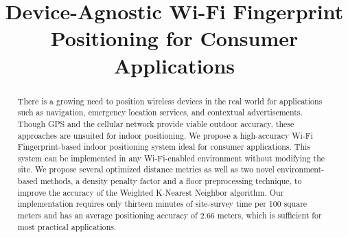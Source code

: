 \documentclass[conference]{IEEEtran}
\begin{document}
\title{Device-Agnostic Wi-Fi Fingerprint Positioning for Consumer Applications}

\author{
	
	
}

\maketitle

\begin{abstract}
There is a growing need to position wireless devices in the real world for applications such as navigation, emergency location services, and contextual advertisements. Though GPS and the cellular network provide viable outdoor accuracy, these approaches are unsuited for indoor positioning. We propose a high-accuracy Wi-Fi Fingerprint-based indoor positioning system ideal for consumer applications. This system can be implemented in any Wi-Fi-enabled environment without modifying the site. We propose several optimized distance metrics as well as two novel environment-based methods, a density penalty factor and a floor preprocessing technique, to improve the accuracy of the Weighted K-Nearest Neighbor algorithm. Our implementation requires only thirteen minutes of site-survey time per 100 square meters and has an average positioning accuracy of 2.66 meters, which is sufficient for most practical applications.
\end{abstract}

\IEEEpeerreviewmaketitle
\end{document}
